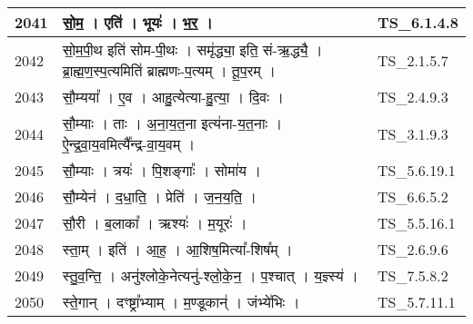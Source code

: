 \documentclass[17pt]{extarticle}
\begin{document}
\begin{longtable}{||p{0.4in}||p{4.9in}||p{0.9in}||}
    \hline
        
    2041 & सो॒म॒   ।   एति॑   ।   भूयः॑   ।   भ॒र॒   ।    & TS\_6.1.4.8       \\
    
    \hline
        
    2042 & सो॒म॒पी॒थ इति॑ सोम{-}पी॒थः   ।   समृ॑द्ध्या॒ इति॒ सं{-}ऋ॒द्ध्यै॒   ।   ब्रा॒ह्म॒ण॒स्प॒त्यमिति॑ ब्राह्मणः{-}प॒त्यम्   ।   तू॒प॒रम्   ।    & TS\_2.1.5.7       \\
    
    \hline
        
    2043 & सौ॒म्यया᳚   ।   ए॒व   ।   आहु॒त्येत्या{-}हु॒त्या॒   ।   दि॒वः   ।    & TS\_2.4.9.3       \\
    
    \hline
        
    2044 & सौ॒म्याः   ।   ताः   ।   अ॒ना॒य॒त॒ना इत्य॑ना{-}य॒त॒नाः   ।   ऐ॒न्द्र॒वा॒य॒वमित्यै᳚न्द्र{-}वा॒य॒वम्   ।    & TS\_3.1.9.3       \\
    
    \hline
        
    2045 & सौ॒म्याः   ।   त्रयः॑   ।   पि॒शङ्गाः᳚   ।   सोमा॑य   ।    & TS\_5.6.19.1       \\
    
    \hline
        
    2046 & सौ॒म्येन॑   ।   द॒धा॒ति॒   ।   प्रेति॑   ।   ज॒न॒य॒ति॒   ।    & TS\_6.6.5.2       \\
    
    \hline
        
    2047 & सौ॒री   ।   ब॒लाका᳚   ।   ऋश्यः॑   ।   म॒यूरः॑   ।    & TS\_5.5.16.1       \\
    
    \hline
        
    2048 & स्ता॒म्   ।   इति॑   ।   आ॒ह॒   ।   आ॒शिष॒मित्या᳚{-}शिष᳚म्   ।    & TS\_2.6.9.6       \\
    
    \hline
        
    2049 & स्तु॒व॒न्ति॒   ।   अनु॑श्लोके॒नेत्यनु॑{-}श्लो॒के॒न॒   ।   प॒श्चात्   ।   य॒ज्ञ्स्य॑   ।    & TS\_7.5.8.2       \\
    
    \hline
        
    2050 & स्ते॒गान्   ।   दꣳष्ट्रा᳚भ्याम्   ।   म॒ण्डूकान्॑   ।   जंभ्ये॑भिः   ।    & TS\_5.7.11.1       \\
    
    \hline
        

\end{longtable}
\end{document}
